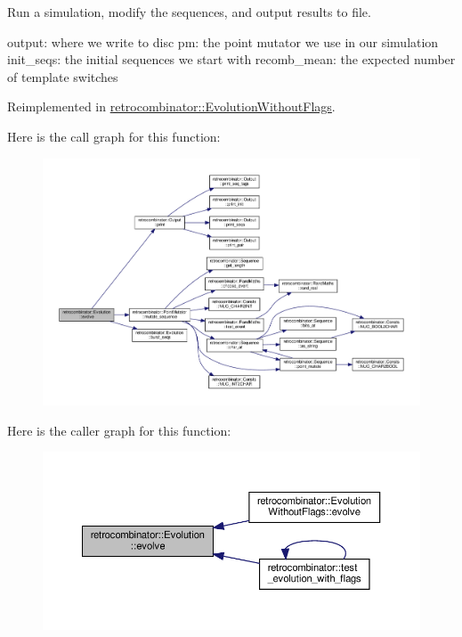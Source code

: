 Run a simulation, modify the sequences, and output results to file. 

output\+: where we write to disc pm\+: the point mutator we use in our simulation init\+\_\+seqs\+: the initial sequences we start with recomb\+\_\+mean\+: the expected number of template switches 

Reimplemented in \hyperlink{classretrocombinator_1_1EvolutionWithoutFlags_a9e27b532826998a88d2c157daf53c447}{retrocombinator\+::\+Evolution\+Without\+Flags}.

Here is the call graph for this function\+:
\nopagebreak
\begin{figure}[H]
\begin{center}
\leavevmode
\includegraphics[width=350pt]{classretrocombinator_1_1Evolution_a0b8a181242ea8ee3072258fa7ed416f4_cgraph}
\end{center}
\end{figure}
Here is the caller graph for this function\+:
\nopagebreak
\begin{figure}[H]
\begin{center}
\leavevmode
\includegraphics[width=350pt]{classretrocombinator_1_1Evolution_a0b8a181242ea8ee3072258fa7ed416f4_icgraph}
\end{center}
\end{figure}


